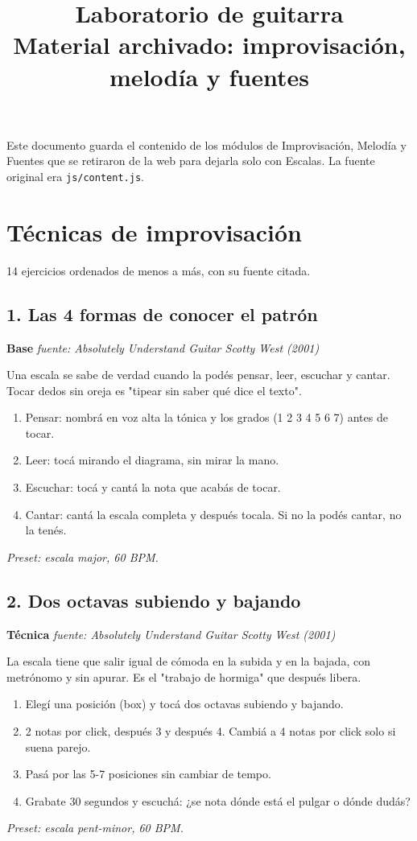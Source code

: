 \documentclass[11pt,a4paper]{article}
\title{Laboratorio de guitarra\\[2pt]\large Material archivado: improvisaci\'on, melod\'ia y fuentes}
\author{}
\date{}
\begin{document}
\maketitle
Este documento guarda el contenido de los m\'odulos de Improvisaci\'on, Melod\'ia y Fuentes que se retiraron de la web para dejarla solo con Escalas. La fuente original era \texttt{js/content.js}.
\tableofcontents
\newpage
\section{T\'ecnicas de improvisaci\'on}
14 ejercicios ordenados de menos a m\'as, con su fuente citada.
\subsection{1. Las 4 formas de conocer el patrón}
\textbf{Base} \hfill \emph{fuente: Absolutely Understand Guitar \textemdash{} Scotty West (2001)}
\par Una escala se sabe de verdad cuando la podés pensar, leer, escuchar y cantar. Tocar dedos sin oreja es "tipear sin saber qué dice el texto".
\begin{enumerate}
\item Pensar: nombrá en voz alta la tónica y los grados (1 2 3 4 5 6 7) antes de tocar.
\item Leer: tocá mirando el diagrama, sin mirar la mano.
\item Escuchar: tocá y cantá la nota que acabás de tocar.
\item Cantar: cantá la escala completa y después tocala. Si no la podés cantar, no la tenés.
\end{enumerate}
\emph{Preset: escala major, 60 BPM.}
\subsection{2. Dos octavas subiendo y bajando}
\textbf{Técnica} \hfill \emph{fuente: Absolutely Understand Guitar \textemdash{} Scotty West (2001)}
\par La escala tiene que salir igual de cómoda en la subida y en la bajada, con metrónomo y sin apurar. Es el "trabajo de hormiga" que después libera.
\begin{enumerate}
\item Elegí una posición (box) y tocá dos octavas subiendo y bajando.
\item 2 notas por click, después 3 y después 4. Cambiá a 4 notas por click solo si suena parejo.
\item Pasá por las 5-7 posiciones sin cambiar de tempo.
\item Grabate 30 segundos y escuchá: ¿se nota dónde está el pulgar o dónde dudás?
\end{enumerate}
\emph{Preset: escala pent-minor, 60 BPM.}
\end{document}
